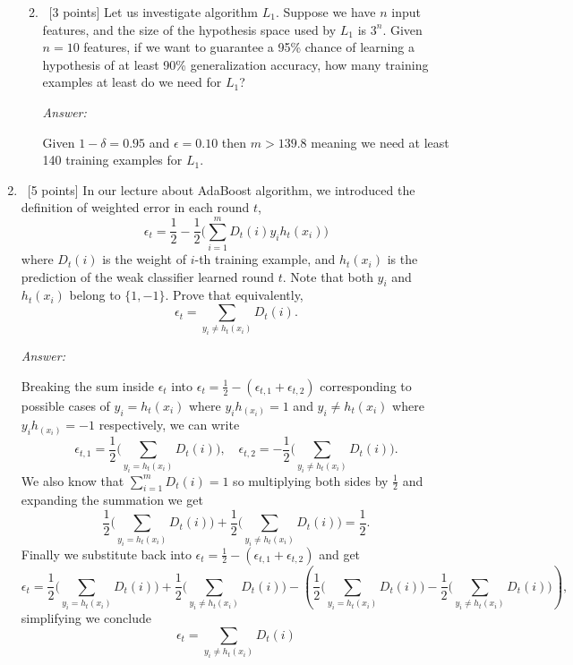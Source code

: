 \documentclass[12pt, fullpage,letterpaper]{article}
\begin{document}
\begin{enumerate}
\begin{enumerate}
\begin{enumerate}
	\end{enumerate}
	\item~[3 points] Let us investigate algorithm $L_1$. Suppose we have $n$ input features, and the size of the hypothesis space used by $L_1$ is $3^n$. Given $n=10$ features, if we want to guarantee a 95\% chance of learning a hypothesis of at least 90\% generalization accuracy, how many training examples at least do we need for $L_1$?

	\textit{Answer:}

	Given $1-\delta = 0.95$ and $\epsilon = 0.10$ then $m > 139.8$ meaning we need at least 140 training examples for $L_1$.


\end{enumerate}

\item~[5 points] In our lecture about AdaBoost algorithm, we introduced the definition of weighted error in each round $t$, 
\[
\epsilon_t = \frac{1}{2} - \frac{1}{2}\big(\sum_{i=1}^m D_t(i) y_i h_t(x_i)\big)
\]
where $D_t(i)$ is the weight of $i$-th training example, and $h_t(x_i)$ is the prediction of the weak classifier learned round $t$. Note that both $y_i$ and $h_t(x_i)$ belong to $\{1, -1\}$. Prove that equivalently,
\[
\epsilon_t = \sum_{y_i \neq h_t(x_i)} D_t(i).
\]

\textit{Answer:}

Breaking the sum inside $\epsilon_t$ into $\epsilon_t=\frac{1}{2} - (\epsilon_{t,1}+\epsilon_{t,2})$ corresponding to possible cases of $y_i=h_t(x_i)$ where $y_i h_(x_i) = 1$ and $y_i \neq h_t(x_i)$ where $y_i h_(x_i) = -1$ respectively, we can write
\[
	\epsilon_{t,1} = \frac{1}{2}\big(\sum_{y_i = h_t(x_i)} D_t(i)),\quad 
	\epsilon_{t,2} = - \frac{1}{2}\big(\sum_{y_i \neq h_t(x_i)} D_t(i)).
\]
We also know that $\sum_{i=1}^m D_t(i) = 1$ so multiplying both sides by $\frac{1}{2}$ and expanding the summation we get
\[
	\frac{1}{2}\big(\sum_{y_i = h_t(x_i)} D_t(i)) + 
	\frac{1}{2}\big(\sum_{y_i \neq h_t(x_i)} D_t(i)) = 
	\frac{1}{2}.
\]
Finally we substitute back into $\epsilon_t=\frac{1}{2} - (\epsilon_{t,1}+\epsilon_{t,2})$ and get
\[
	\epsilon_t = 
	\frac{1}{2}\big(\sum_{y_i = h_t(x_i)} D_t(i)) + 
	\frac{1}{2}\big(\sum_{y_i \neq h_t(x_i)} D_t(i)) - 
	\left(\frac{1}{2}\big(\sum_{y_i = h_t(x_i)} D_t(i)) -
	\frac{1}{2}\big(\sum_{y_i \neq h_t(x_i)} D_t(i))\right),
\]
simplifying we conclude
\[
	\epsilon_t = 
	\sum_{y_i \neq h_t(x_i)} D_t(i)
\]


\end{enumerate}
\end{document}
